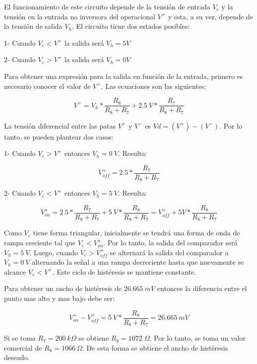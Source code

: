 El funcionamiento de este circuito depende de la tensión de entrada $V_e$ y la tensión en la entrada no inversora del operacional $V^+$ y esta, a su vez, depende de la tensión de salida $V_h$. El circuito tiene dos estados posibles:

1- Cuando $V_e<V^+$ la salida será $V_h=5V$

2- Cuando $V_e>V^+$ la salida será $V_h=0V$

Para obtener una expresión para la salida en función de la entrada, primero es necesario conocer el valor de $V^+$.
Las ecuaciones son las siguientes:

\begin{equation} 
	V^+ = V_h*\frac{R_{8}}{R_{8}+R_{7}} + 2.5\:V*\frac{R_{7}}{R_{8}+R_{7}}
\end{equation} 

La tensión diferencial entre las patas $V^+$ y $V^-$ es $Vd=(V^+)-(V^-)$. Por lo tanto, se pueden plantear dos casos: 

1- Cuando $V_e>V^+$ entonces $V_h=0\:V$. Resulta:

\begin{equation}
	V^+_{off}=2.5*\frac{R_{7}}{R_{8}+R_{7}}
\end{equation}

2- Cuando $V_e<V^+$ entonces $V_h=5\:V$. Resulta:

\begin{equation}
	V^+_{on}=2.5*\frac{R_{7}}{R_{8}+R_{7}} + 5\:V*\frac{R_{8}}{R_{8}+R_{7}}=V^+_{off}+5V*\frac{R_{8}}{R_{8}+R_{7}}
\end{equation}

Como $V_{e}$ tiene forma triangular, inicialmente se tendrá una forma de onda de rampa creciente tal que $V_e < V^+_{on}$. Por lo tanto, la salida del comparador será $V_{h}=5\:V$. Luego, cuando $V_e > V^+_{off}$ se alternará la salida del comparador a $V_{h}=0\:V$ alternando la señal a una rampa decreciente hasta que nuevamente se alcance $V_e<V^+$. Este ciclo de histéresis se mantiene constante.

Para obtener un ancho de histéresis de $26.665\:mV$ entonces la diferencia entre el punto mas alto y mas bajo debe ser:

\begin{equation}
	V^+_{on}-V^+_{off} = 5\:V*\frac{R_{8}}{R_{8}+R_{7}}= 26.665\:mV
\end{equation}

Si se toma $R_{7}=200 \:k\Omega$ se obtiene $R_{8}=1072 \;\Omega$. Por lo tanto, se toma un valor comercial de $R_{8}=1066\:\Omega$. De esta forma se obtiene el ancho de histéresis deseado.

